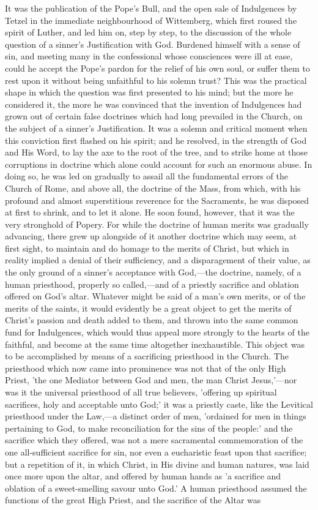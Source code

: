 \documentclass[
]{book}
\begin{document}
It was the publication of the Pope's Bull, and the open sale of Indulgences by Tetzel in the immediate neighbourhood of Wittemberg, which first roused the spirit of Luther, and led him on, step by step, to the discussion of the whole question of a sinner's Justification with God. Burdened himself with a sense of sin, and meeting many in the confessional whose consciences were ill at ease, could he accept the Pope's pardon for the relief of his own soul, or suffer them to rest upon it without being unfaithful to his solemn trust? This was the practical shape in which the question was first presented to his mind; but the more he considered it, the more he was convinced that the invention of Indulgences had grown out of certain false doctrines which had long prevailed in the Church, on the subject of a sinner's Justification. It was a solemn and critical moment when this conviction first flashed on his spirit; and he resolved, in the strength of God and His Word, to lay the axe to the root of the tree, and to strike home at those corruptions in doctrine which alone could account for such an enormous abuse. In doing so, he was led on gradually to assail all the fundamental errors of the Church of Rome, and above all, the doctrine of the Mass, from which, with his profound and almost superstitious reverence for the Sacraments, he was disposed at first to shrink, and to let it alone. He soon found, however, that it was the very stronghold of Popery. For while the doctrine of human merits was gradually advancing, there grew up alongside of it another doctrine which may seem, at first sight, to maintain and do homage to the merits of Christ, but which in reality implied a denial of their sufficiency, and a disparagement of their value, as the only ground of a sinner's acceptance with God,---the doctrine, namely, of a human priesthood, properly so called,---and of a priestly sacrifice and oblation offered on God's altar. Whatever might be said of a man's own merits, or of the merits of the saints, it would evidently be a great object to get the merits of Christ's passion and death added to them, and thrown into the same common fund for Indulgences, which would thus appeal more strongly to the hearts of the faithful, and become at the same time altogether inexhaustible. This object was to be accomplished by means of a sacrificing priesthood in the Church. The priesthood which now came into prominence was not that of the only High Priest, 'the one Mediator between God and men, the man Christ Jesus,'---nor was it the universal priesthood of all true believers, 'offering up spiritual sacrifices, holy and acceptable unto God;' it was a priestly caste, like the Levitical priesthood under the Law,---a distinct order of men, 'ordained for men in things pertaining to God, to make reconciliation for the sins of the people:' and the sacrifice which they offered, was not a mere sacramental commemoration of the one all-sufficient sacrifice for sin, nor even a eucharistic feast upon that sacrifice; but a repetition of it, in which Christ, in His divine and human natures, was laid once more upon the altar, and offered by human hands as 'a sacrifice and oblation of a sweet-smelling savour unto God.' A human priesthood assumed the functions of the great High Priest, and the sacrifice of the Altar was 
\end{document}
